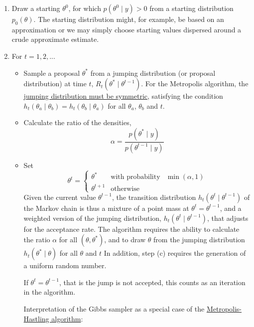 \documentclass[lecture,12pt,]{pcms-l}
\numberwithin{section}{chapter}
\numberwithin{equation}{chapter}
\theoremstyle{plain}
\theoremstyle{definition}
\theoremstyle{definition}
\begin{document}
\begin{enumerate}
\item Draw a starting $\theta^0$, for which $p(\theta^0 \mid y)>0$ from a starting distribution $p_0(\theta)$. The starting distribution might, for example, be based on an approximation or we may simply choose starting values dispersed around a crude approximate estimate.
\item For $t=1,2,...$
 \begin{itemize}

 \item Sample a proposal $\theta^*$ from a jumping distribution (or proposal distribution) at time $t$, $R_t(\theta^* \mid \theta^{t-1})$. For the Metropolis algorithm, the \underline{jumping distribution must be symmetric}, satisfying the condition $h_t(\theta_a \mid \theta_b)=h_t(\theta_b \mid \theta_a)$ for all $\theta_a$, $\theta_b$ and $t$.
\item Calculate the ratio of the densities,
\begin{equation}
\alpha = \frac{p(\theta^* \mid y)}{p(\theta^{t-1} \mid y)}
\end{equation}
\item Set 
\begin{equation}
\theta^{t}= 
\left\{\begin{matrix}
\theta^* & \text{with probability} & \min(\alpha,1)\\ 
\theta^{t+1} & \text{otherwise} & 
\end{matrix}\right.
\end{equation}
Given the current value $\theta^{t-1}$, the transition distribution $h_t(\theta^t \mid \theta^{t-1})$ of the Markov chain is thus a mixture of a point mass at $\theta^t=\theta^{t-1}$, and a weighted version of the jumping distribution, $h_t(\theta^t \mid \theta^{t-1})$, that adjusts for the acceptance rate. The algorithm requires the ability to calculate the ratio $\alpha$ for all $(\theta,\theta^*)$, and to draw $\theta$ from the jumping distribution $h_t(\theta^* \mid \theta)$ for all $\theta$ and $t$ In addition, step (c) requires the generation of a uniform random number.

If $\theta^t = \theta^{t-1}$, that is the jump is not accepted, this counts as an iteration in the algorithm. 

Interpretation of the Gibbs sampler as a special case of the \underline{Metropolis-Hastling algorithm}:


\end{itemize}
\end{enumerate}
\end{document}
